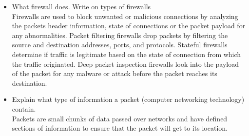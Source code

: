 \begin{itemize}
    \item What firewall does. Write on types of firewalls\\
    Firewalls are used to block unwanted or malicious connections by analyzing the packets header information, state of connections or the packet payload for any abnormalities.
    Packet filtering firewalls drop packets by filtering the source and destination addresses, ports, and protocols.
    Stateful firewalls determine if traffic is legitimate based on the state of connection from which the traffic originated.
    Deep packet inspection firewalls look into the payload of the packet for any malware or attack before the packet reaches its destination.
    \item Explain what type of information a packet (computer networking technology) contain.\\
    Packets are small chunks of data passed over networks and have defined sections of information to ensure that the packet will get to its location.
\end{itemize}